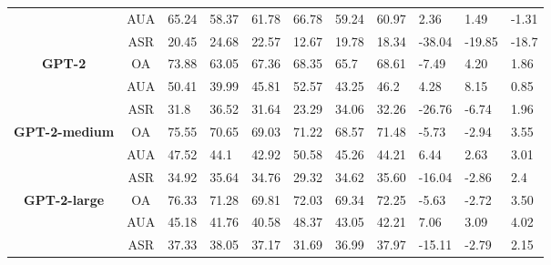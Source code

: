 \documentclass{article}
\begin{document}
\begin{table}[ht]
\begin{tabular}{c|c|p{0.6cm}p{0.6cm}p{0.6cm}|p{1cm}p{1cm}p{1cm}|p{1cm}p{1cm}p{1cm}}
& AUA & 65.24 & 58.37 & 61.78 & 66.78 & 59.24 & 60.97 & 2.36 & 1.49 & -1.31 \\ 
& ASR & 20.45 & 24.68 & 22.57 & 12.67 & 19.78 & 18.34 & -38.04 & -19.85 & -18.7 \\ \hline
\multirow{3}{*}{\textbf{GPT-2}}        & OA   & 73.88 & 63.05 & 67.36 & 68.35 & 65.7  & 68.61 & -7.49 & 4.20  & 1.86 \\ 
& AUA  & 50.41 & 39.99 & 45.81 & 52.57 & 43.25 & 46.2  & 4.28  & 8.15  & 0.85 \\ 
& ASR  & 31.8  & 36.52 & 31.64 & 23.29 & 34.06 & 32.26 & -26.76 & -6.74 & 1.96  \\ \hline
\multirow{3}{*}{\textbf{GPT-2-medium}}        & OA   & 75.55  & 70.65 & 69.03 & 71.22 & 68.57 & 71.48 & -5.73 & -2.94 & 3.55 \\ 
& AUA  & 47.52  & 44.1  & 42.92 & 50.58 & 45.26 & 44.21 & 6.44  & 2.63  & 3.01 \\ 
& ASR  & 34.92  & 35.64 & 34.76 & 29.32 & 34.62 & 35.60 & -16.04 & -2.86 & 2.4  \\ \hline
\multirow{3}{*}{\textbf{GPT-2-large}}        & OA   & 76.33  & 71.28 & 69.81 & 72.03 & 69.34 & 72.25 & -5.63 & -2.72 & 3.50 \\ 
& AUA  & 45.18  & 41.76 & 40.58 & 48.37 & 43.05 & 42.21 & 7.06  & 3.09  & 4.02  \\ 
& ASR  & 37.33  & 38.05 & 37.17 & 31.69 & 36.99 & 37.97 & -15.11 & -2.79 & 2.15 \\ \hline


\end{tabular}
\end{table}
\end{document}
